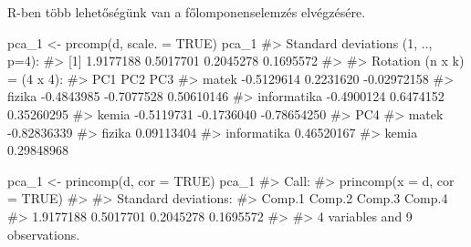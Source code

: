 \documentclass[
  letterpaper,
]{krantz}
\makeatletter
\newenvironment{Shaded}{\begin{snugshade}}{\end{snugshade}}
\newcommand{\AttributeTok}[1]{\textcolor[rgb]{0.40,0.45,0.13}{#1}}
\newcommand{\CommentTok}[1]{\textcolor[rgb]{0.37,0.37,0.37}{#1}}
\newcommand{\ConstantTok}[1]{\textcolor[rgb]{0.56,0.35,0.01}{#1}}
\newcommand{\FunctionTok}[1]{\textcolor[rgb]{0.28,0.35,0.67}{#1}}
\newcommand{\NormalTok}[1]{\textcolor[rgb]{0.00,0.23,0.31}{#1}}
\newcommand{\OtherTok}[1]{\textcolor[rgb]{0.00,0.23,0.31}{#1}}
\newenvironment{kframe}{%
\medskip{}
\setlength{\fboxsep}{.8em}
 \def\at@end@of@kframe{}%
 \ifinner\ifhmode%
  \def\at@end@of@kframe{\end{minipage}}%
  \begin{minipage}{\columnwidth}%
 \fi\fi%
 \def\FrameCommand##1{\hskip\@totalleftmargin \hskip-\fboxsep
 \colorbox{shadecolor}{##1}\hskip-\fboxsep
     \hskip-\linewidth \hskip-\@totalleftmargin \hskip\columnwidth}%
 \MakeFramed {\advance\hsize-\width
   \@totalleftmargin\z@ \linewidth\hsize
   \@setminipage}}%
 {\par\unskip\endMakeFramed%
 \at@end@of@kframe}
\renewenvironment{Shaded}{\begin{kframe}}{\end{kframe}}
\makeatother
\begin{document}
R-ben több lehetőségünk van a főlomponenselemzés elvégzésére.

\begin{Shaded}
\begin{Highlighting}[]
\NormalTok{pca\_1 }\OtherTok{\textless{}{-}} \FunctionTok{prcomp}\NormalTok{(d, }\AttributeTok{scale. =} \ConstantTok{TRUE}\NormalTok{)}
\NormalTok{pca\_1}
\CommentTok{\#\textgreater{} Standard deviations (1, .., p=4):}
\CommentTok{\#\textgreater{} [1] 1.9177188 0.5017701 0.2045278 0.1695572}
\CommentTok{\#\textgreater{} }
\CommentTok{\#\textgreater{} Rotation (n x k) = (4 x 4):}
\CommentTok{\#\textgreater{}                    PC1        PC2         PC3}
\CommentTok{\#\textgreater{} matek       {-}0.5129614  0.2231620 {-}0.02972158}
\CommentTok{\#\textgreater{} fizika      {-}0.4843985 {-}0.7077528  0.50610146}
\CommentTok{\#\textgreater{} informatika {-}0.4900124  0.6474152  0.35260295}
\CommentTok{\#\textgreater{} kemia       {-}0.5119731 {-}0.1736040 {-}0.78654250}
\CommentTok{\#\textgreater{}                     PC4}
\CommentTok{\#\textgreater{} matek       {-}0.82836339}
\CommentTok{\#\textgreater{} fizika       0.09113404}
\CommentTok{\#\textgreater{} informatika  0.46520167}
\CommentTok{\#\textgreater{} kemia        0.29848968}
\end{Highlighting}
\end{Shaded}

\begin{Shaded}
\begin{Highlighting}[]
\NormalTok{pca\_1 }\OtherTok{\textless{}{-}} \FunctionTok{princomp}\NormalTok{(d, }\AttributeTok{cor =} \ConstantTok{TRUE}\NormalTok{)}
\NormalTok{pca\_1}
\CommentTok{\#\textgreater{} Call:}
\CommentTok{\#\textgreater{} princomp(x = d, cor = TRUE)}
\CommentTok{\#\textgreater{} }
\CommentTok{\#\textgreater{} Standard deviations:}
\CommentTok{\#\textgreater{}    Comp.1    Comp.2    Comp.3    Comp.4 }
\CommentTok{\#\textgreater{} 1.9177188 0.5017701 0.2045278 0.1695572 }
\CommentTok{\#\textgreater{} }
\CommentTok{\#\textgreater{}  4  variables and  9 observations.}
\end{Highlighting}
\end{Shaded}
\end{document}
